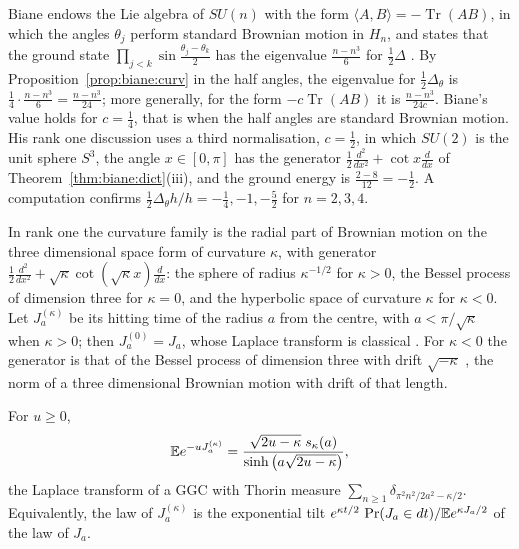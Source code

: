 \begin{remark}\label{rem:biane:prop26}
Biane endows the Lie algebra of $SU(n)$ with the form $\langle A,B\rangle=-\operatorname{Tr}(AB)$, in which the angles $\theta_j$ perform standard Brownian motion in $H_n$, and states that the ground state $\prod_{j<k}\sin\frac{\theta_j-\theta_k}2$ has the eigenvalue $\frac{n-n^3}6$ for $\frac12\Delta$ \cite[Proposition 2.6]{Biane09}. By Proposition~\ref{prop:biane:curv} in the half angles, the eigenvalue for $\frac12\Delta_\theta$ is $\frac14\cdot\frac{n-n^3}6=\frac{n-n^3}{24}$; more generally, for the form $-c\operatorname{Tr}(AB)$ it is $\frac{n-n^3}{24c}$. Biane's value holds for $c=\frac14$, that is when the half angles are standard Brownian motion. His rank one discussion uses a third normalisation, $c=\frac12$, in which $SU(2)$ is the unit sphere $S^3$, the angle $x\in[0,\pi]$ has the generator $\frac12\frac{d^2}{dx^2}+\cot x\frac d{dx}$ of Theorem~\ref{thm:biane:dict}(iii), and the ground energy is $\frac{2-8}{12}=-\frac12$. A computation confirms $\frac12\Delta_\theta h/h=-\frac14,-1,-\frac52$ for $n=2,3,4$.
\end{remark}

In rank one the curvature family is the radial part of Brownian motion on the three dimensional space form of curvature $\kappa$, with generator $\frac12\frac{d^2}{dx^2}+\sqrt\kappa\cot(\sqrt\kappa x)\frac d{dx}$: the sphere of radius $\kappa^{-1/2}$ for $\kappa>0$, the Bessel process of dimension three for $\kappa=0$, and the hyperbolic space of curvature $\kappa$ for $\kappa<0$. Let $J^{(\kappa)}_a$ be its hitting time of the radius $a$ from the centre, with $a<\pi/\sqrt\kappa$ when $\kappa>0$; then $J^{(0)}_a=J_a$, whose Laplace transform is classical \cite{CiesielskiTaylor62}. For $\kappa<0$ the generator is that of the Bessel process of dimension three with drift $\sqrt{-\kappa}$ \cite[(2.5)]{SalminenVallois07}, the norm of a three dimensional Brownian motion with drift of that length.

\begin{proposition}\label{prop:biane:skappa}
For $u\ge0$,
\[
\mathbb{E} e^{-uJ^{(\kappa)}_a}=\frac{\sqrt{2u-\kappa}\;s_\kappa(a)}{\sinh\big(a\sqrt{2u-\kappa}\big)},
\]
the Laplace transform of a GGC with Thorin measure $\sum_{n\ge1}\delta_{\pi^2n^2/2a^2-\kappa/2}$. Equivalently, the law of $J^{(\kappa)}_a$ is the exponential tilt $e^{\kappa t/2}\,\Pr(J_a\in dt)/\mathbb{E} e^{\kappa J_a/2}$ of the law of $J_a$.
\end{proposition}

